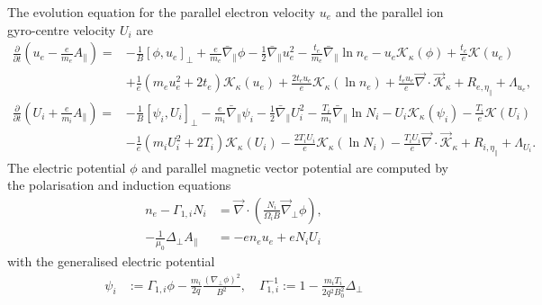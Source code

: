 The evolution equation for the parallel electron velocity \(u_e\) and the parallel ion gyro-centre velocity \(U_i\) are
\begin{align}
\frac{\partial}{\partial t}\left(  u_e -\frac{e}{m_e} A_\parallel\right)
      =&
      - \frac{1 }{ B} \left[ \phi, u_e  \right]_{\perp}
      +  \frac{e}{m_e}   \bar \nabla_\parallel \phi
      -   \frac{1}{2}   \bar \nabla_\parallel u_e^2
      - \frac{t_e}{m_e } \bar \nabla_\parallel \ln  n_e
     - u_e   \mathcal{K}_{\kappa} \left( \phi  \right)
     + \frac{t_e}{e} \mathcal{K}\left(  u_e \right)
     \nonumber  \\    &
     + \frac{1}{e} \left(m_e  u_e^2 +  2  t_e\right)\mathcal{K}_{\kappa} \left(u_e\right)
    + \frac{2  t_e u_e }{ e} \mathcal{K}_{\kappa} \left(\ln n_e \right)
    + \frac{t_e  u_e }{e} \vec{\nabla} \cdot  \vec{\mathcal{K}}_{\kappa}
    + R_{e, \eta_\parallel}+\Lambda_{u_e} ,  \\
\frac{\partial}{\partial t}   \left( U_i + \frac{e}{m_i} A_\parallel\right)
      =&
      - \frac{1 }{ B} \left[ \psi_i, U_i  \right]_{\perp}
      -  \frac{e}{m_i}   \bar \nabla_\parallel \psi_i
      -     \frac{1}{2}  \bar \nabla_\parallel U_i^2
      - \frac{T_i}{m_i } \bar \nabla_\parallel \ln  N_i
     -  U_i  \mathcal{K}_{\kappa} \left( \psi_i  \right)
     - \frac{T_i}{e} \mathcal{K}\left(  U_i \right)
     \nonumber  \\    &
           - \frac{1}{e}\left(m_i  U_i^2 + 2  T_i \right) \mathcal{K}_{\kappa} \left(U_i\right)
           - \frac{2  T_i U_i }{ e} \mathcal{K}_{\kappa} \left(\ln N_i \right)
           - \frac{T_i  U_i }{e} \vec{\nabla} \cdot  \vec{\mathcal{K}}_{\kappa}
         + R_{i,\eta_\parallel}  +\Lambda_{U_i}  .
\end{align}
The electric potential \(\phi\) and parallel magnetic vector potential are
computed by the polarisation and induction equations
\begin{align}
  n_e -\Gamma_{1,i} N_i &= \vec{\nabla} \cdot\left(\frac{N_i}{\Omega_i B} \vec{\nabla}_\perp \phi\right), \\
  -\frac{1}{\mu_0} \Delta_\perp A_\parallel &= -en_e u_e + eN_i U_i
  \label{eq:polarisation_dimensional}
\end{align}
with the generalised electric potential
\begin{align}
  \psi_i&:= \Gamma_{1,i} \phi - \frac{m_i }{2 q}\frac{(\nabla_\perp\phi)^2}{B^2}, \quad \Gamma_{1,i}^{-1} := 1-\frac{m_i T_i}{2q^2 B_0^2} \Delta_\perp
\end{align}

